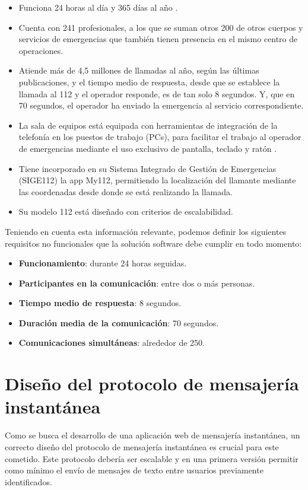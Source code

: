 \begin{itemize}
  \item Funciona 24 horas al día y 365 días al año \cite{madrid1}.
  \item Cuenta con 241 profesionales, a los que se suman otros 200 de otros cuerpos y servicios de emergencias que también tienen presencia en el mismo centro de operaciones.
  \item Atiende más de 4,5 millones de llamadas al año, según las últimas publicaciones, y el tiempo medio de respuesta, desde que se establece la llamada al 112 y el operador responde, es de tan solo 8 segundos. Y, que en 70 segundos, el operador ha enviado la emergencia al servicio correspondiente.
  \item La sala de equipos está equipada con herramientas de integración de la telefonía en los puestos de trabajo (PCs), para facilitar el trabajo al operador de emergencias mediante el uso exclusivo de pantalla, teclado y ratón \cite{madrid4}.
  \item Tiene incorporado en su Sistema Integrado de Gestión de Emergencias (SIGE112) la app My112, permitiendo la localización del llamante mediante las coordenadas desde donde se está realizando la llamada.
  \item Su modelo 112 está diseñado con criterios de escalabilidad.
\end{itemize}

Teniendo en cuenta esta información relevante, podemos definir los siguientes requisitos no funcionales que la solución software debe cumplir en todo momento:

\begin{itemize}
  \item \textbf{Funcionamiento}: durante 24 horas seguidas.
  \item \textbf{Participantes en la comunicación}: entre dos o más personas.
  \item \textbf{Tiempo medio de respuesta}: 8 segundos.
  \item \textbf{Duración media de la comunicación}: 70 segundos.
  \item \textbf{Comunicaciones simultáneas}: alrededor de 250.
\end{itemize}

\section{Diseño del protocolo de mensajería instantánea}

Como se busca el desarrollo de una aplicación web de mensajería instantánea, un correcto diseño del protocolo de mensajería instantánea es crucial para este cometido. Este protocolo debería ser escalable y en una primera versión permitir como mínimo el envío de mensajes de texto entre usuarios previamente identificados.

